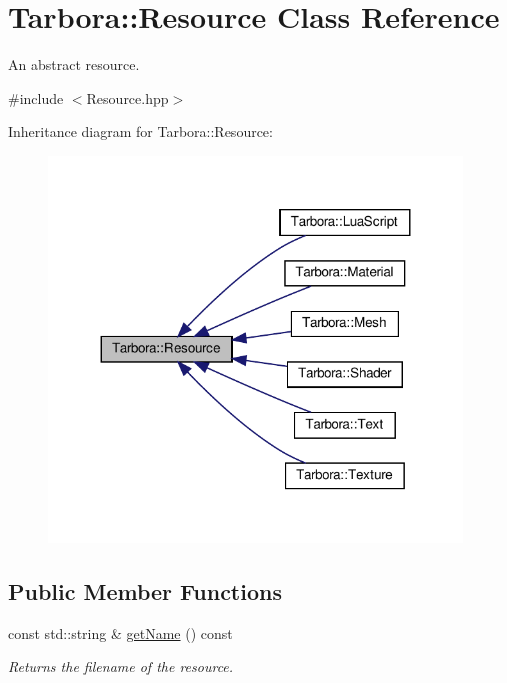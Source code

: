 \hypertarget{classTarbora_1_1Resource}{}\section{Tarbora\+:\+:Resource Class Reference}
\label{classTarbora_1_1Resource}


An abstract resource.  




{\ttfamily \#include $<$Resource.\+hpp$>$}



Inheritance diagram for Tarbora\+:\+:Resource\+:
\nopagebreak
\begin{figure}[H]
\begin{center}
\leavevmode
\includegraphics[width=311pt]{classTarbora_1_1Resource__inherit__graph}
\end{center}
\end{figure}
\subsection*{Public Member Functions}
\begin{DoxyCompactItemize}
\item 
\mbox{\label{classTarbora_1_1Resource_afc89548edc7c22bfe6c2270dd011d189}} 
const std\+::string \& \hyperlink{classTarbora_1_1Resource_afc89548edc7c22bfe6c2270dd011d189}{get\+Name} () const
\begin{DoxyCompactList}\small\item\em Returns the filename of the resource. \end{DoxyCompactList}\end{DoxyCompactItemize}
